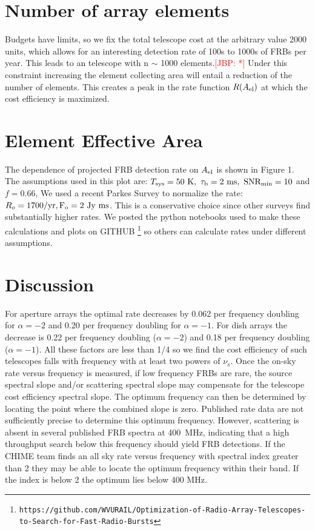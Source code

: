 \documentclass[fleqn,usenatbib]{mnras}
\newcommand{\kibitz}[2]{\ifnum\Comments=1\textcolor{#1}{#2}\fi}
\newcommand{\jbp}[1]{\kibitz{red}      {[JBP: #1]}}
\begin{document}
\section{Number of array elements}

Budgets have limits, so we fix the total telescope cost at the arbitrary value 2000 units, which allows for an interesting detection rate of 100s to 1000s of FRBs per year.  This leads to an telescope with n $\sim$ 1000  elements.\jbp{*} Under this constraint increasing the element collecting area will entail a reduction of the number of elements. This creates a peak in the rate function $R(A_{\rm{el}})$ at which the cost efficiency is maximized.

\section{Element Effective Area}

The dependence of projected FRB detection rate on $A_{\rm{el}}$ is shown in Figure 1. The assumptions used in this plot are: $T_{\rm{sys}}= 50~\rm{K},~ \tau_b = 2~\rm{ms},~ SNR_{min}=10$ and $f=0.66$, We used a recent Parkes Survey to normalize the rate: $R_o = 1700 \rm{/yr} , F_o= 2~\rm{Jy~ms}$. This is a conservative choice since other surveys find substantially higher rates. We posted the python notebooks used to make these calculations and plots on GITHUB \footnote{\texttt{https://github.com/WVURAIL/Optimization-of-Radio-Array-Telescopes-to-Search-for-Fast-Radio-Bursts} } so others can calculate rates under different assumptions. 
 
\section{Discussion}

For aperture arrays the optimal rate decreases by 0.062 per frequency doubling for $\alpha =-2$ and 0.20 per frequency doubling for  $\alpha =-1$.  For dish arrays the decrease is 0.22 per frequency doubling ($\alpha =-2$) and 0.18 per frequency doubling ($\alpha =-1$). All these factors are less than 1/4 so we find the cost efficiency of such telescopes falls with frequency with at least two powers of $\nu_s$. Once the on-sky rate versus frequency is measured, if low frequency FRBs are rare, the source spectral slope and/or scattering spectral slope may compensate for the telescope cost efficiency spectral slope. The optimum frequency can then be determined by locating the point where the combined slope is zero. Published rate data are not sufficiently precise to determine this optimum frequency. However, scattering is absent in several published FRB spectra at 400~MHz, indicating that a high throughput search below this frequency should yield FRB detections. 
If the CHIME team finds an all sky rate versus frequency with spectral index greater than 2 they may be able to locate the optimum frequency within their band. If the index is below 2 the optimum lies below 400 MHz. 
\end{document}
